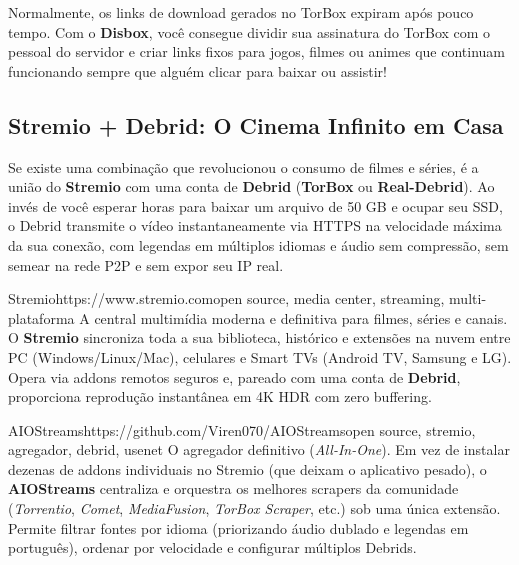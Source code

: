 \documentclass{pousadaguide}
\begin{document}
\begin{dica}
Normalmente, os links de download gerados no TorBox expiram após pouco tempo. Com o \textbf{Disbox}, você consegue dividir sua assinatura do TorBox com o pessoal do servidor e criar links fixos para jogos, filmes ou animes que continuam funcionando sempre que alguém clicar para baixar ou assistir!
\end{dica}

\subsection{Stremio + Debrid: O Cinema Infinito em Casa}

Se existe uma combinação que revolucionou o consumo de filmes e séries, é a união do \textbf{Stremio} com uma conta de \textbf{Debrid} (\textbf{TorBox} ou \textbf{Real-Debrid}). Ao invés de você esperar horas para baixar um arquivo de 50 GB e ocupar seu SSD, o Debrid transmite o vídeo instantaneamente via HTTPS na velocidade máxima da sua conexão, com legendas em múltiplos idiomas e áudio sem compressão, sem semear na rede P2P e sem expor seu IP real.

\begin{ferramenta}[goat,logo=stremio]{Stremio}{https://www.stremio.com}{open source, media center, streaming, multi-plataforma}
A central multimídia moderna e definitiva para filmes, séries e canais. O \textbf{Stremio} sincroniza toda a sua biblioteca, histórico e extensões na nuvem entre PC (Windows/Linux/Mac), celulares e Smart TVs (Android TV, Samsung e LG). Opera via addons remotos seguros e, pareado com uma conta de \textbf{Debrid}, proporciona reprodução instantânea em 4K HDR com zero buffering. 
\end{ferramenta}

\begin{ferramenta}[goat,logo=aiostreams]{AIOStreams}{https://github.com/Viren070/AIOStreams}{open source, stremio, agregador, debrid, usenet}
O agregador definitivo (\emph{All-In-One}). Em vez de instalar dezenas de addons individuais no Stremio (que deixam o aplicativo pesado), o \textbf{AIOStreams} centraliza e orquestra os melhores scrapers da comunidade (\emph{Torrentio}, \emph{Comet}, \emph{MediaFusion}, \emph{TorBox Scraper}, etc.) sob uma única extensão. Permite filtrar fontes por idioma (priorizando áudio dublado e legendas em português), ordenar por velocidade e configurar múltiplos Debrids. 
\end{ferramenta}
\end{document}
